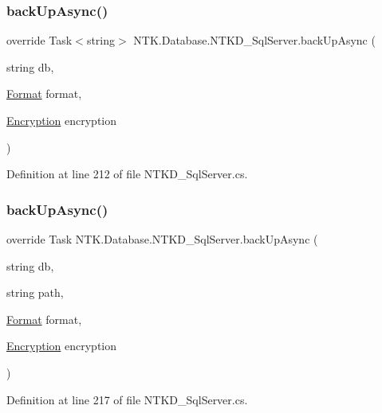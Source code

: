 \subsubsection{\texorpdfstring{backUpAsync()}{backUpAsync()}\hspace{0.1cm}{\footnotesize\ttfamily [1/2]}}
{\footnotesize\ttfamily override Task$<$string$>$ N\+T\+K.\+Database.\+N\+T\+K\+D\+\_\+\+Sql\+Server.\+back\+Up\+Async (\begin{DoxyParamCaption}\item[{string}]{db,  }\item[{\mbox{\hyperlink{namespace_n_t_k_1_1_database_a9bed700210ca4ed5854002637b664789}{Format}}}]{format,  }\item[{\mbox{\hyperlink{namespace_n_t_k_1_1_database_aa21afe93187a6c77c4ccdc988b3c4ac2}{Encryption}}}]{encryption }\end{DoxyParamCaption})}



Definition at line 212 of file N\+T\+K\+D\+\_\+\+Sql\+Server.\+cs.

\mbox{\label{class_n_t_k_1_1_database_1_1_n_t_k_d___sql_server_ad7709c3f59d63d8c5d48878932a94f43}} 
\subsubsection{\texorpdfstring{backUpAsync()}{backUpAsync()}\hspace{0.1cm}{\footnotesize\ttfamily [2/2]}}
{\footnotesize\ttfamily override Task N\+T\+K.\+Database.\+N\+T\+K\+D\+\_\+\+Sql\+Server.\+back\+Up\+Async (\begin{DoxyParamCaption}\item[{string}]{db,  }\item[{string}]{path,  }\item[{\mbox{\hyperlink{namespace_n_t_k_1_1_database_a9bed700210ca4ed5854002637b664789}{Format}}}]{format,  }\item[{\mbox{\hyperlink{namespace_n_t_k_1_1_database_aa21afe93187a6c77c4ccdc988b3c4ac2}{Encryption}}}]{encryption }\end{DoxyParamCaption})}



Definition at line 217 of file N\+T\+K\+D\+\_\+\+Sql\+Server.\+cs.

